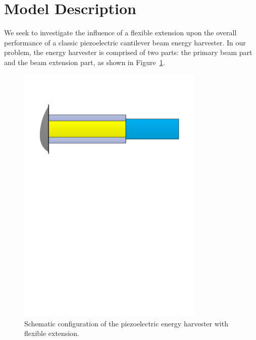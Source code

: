 \documentclass{elsarticle}
\begin{document}
\section{Model Description}

We seek to investigate the influence of a flexible extension upon the overall performance of a classic piezoelectric cantilever beam energy harvester. In our problem, the energy harvester is comprised of two parts: the primary beam part and the beam extension part, as shown in Figure~\ref{fig:fig_beam_configuration}.
\begin{figure}[!htbp]
    \centering
    \includegraphics[width=0.8\textwidth]{./fig_beam_configuration.pdf}
    \caption{Schematic configuration of the piezoelectric energy harvester with flexible extension.}
    \label{fig:fig_beam_configuration}
\end{figure}
\end{document}
